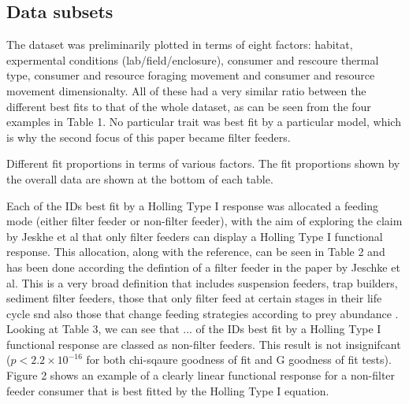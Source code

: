 \documentclass[11pt, a4paper, titlepage]{article}
\begin{document}
\subsection{Data subsets}

The dataset was preliminarily plotted in terms of eight factors: habitat, expermental conditions (lab/field/enclosure), consumer and rescoure thermal type, consumer and resource foraging movement and consumer and resource movement dimensionalty. All of these had a very similar ratio between the different best fits to that of the whole dataset, as can be seen from the four examples in Table 1. No particular trait was best fit by a particular model, which is why the second focus of this paper became filter feeders. 

\begin{table}[ht!]
	\centering{}
\end{table}

\begin{table}[ht!]
	\centering{}
\end{table}

\begin{table}[ht!]
	\centering{}
\end{table}

\begin{table}[ht!]
	\centering{}
	\caption{Different fit proportions in terms of various factors. The fit proportions shown by the overall data are shown at the bottom of each table.}
\end{table}

Each of the IDs best fit by a Holling Type I response was allocated a feeding mode (either filter feeder or non-filter feeder), with the aim of exploring the claim by Jeskhe et al that only filter feeders can display a Holling Type I functional response. This allocation, along with the reference, can be seen in Table 2 and has been done according the defintion of a filter feeder in the paper by Jeschke et al. This is a very broad definition that includes suspension feeders, trap builders, sediment filter feeders, those that only filter feed at certain stages in their life cycle snd also those that change feeding strategies according to prey abundance \parencite{Jeschke2004}.
Looking at Table 3, we can see that ... of the IDs best fit by a Holling Type I functional response are classed as non-filter feeders.
This result is not insignifcant ($p < 2.2\times10^{-16}$ for both chi-sqaure goodness of fit and G goodness of fit tests). Figure 2 shows an example of a clearly linear functional response for a non-filter feeder consumer that is best fitted by the Holling Type I equation.
\end{document}
